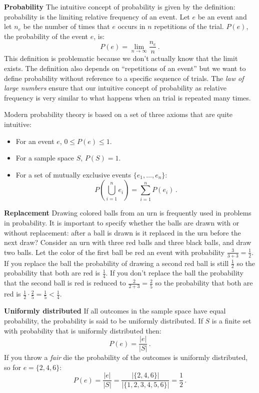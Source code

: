 \textbf{Probability} The intuitive concept of probability is given by the definition: probability is the limiting relative frequency of an event. Let $e$ be an event and let $n_e$ be the number of times that $e$ occurs in $n$ repetitions of the trial. $P(e)$, the probability of the event $e$, is:
\[
P(e) = \lim_{n\rightarrow \infty} \frac{n_e}{n}\,.
\]
This definition is problematic because we don't actually know that the limit exists. The definition also depends on ``repetitions of an event'' but we want to define probability without reference to a specific sequence of trials. The \emph{law of large numbers} ensure that our intuitive concept of probability as relative frequency is very similar to what happens when an trial is repeated many times.

Modern probability theory is based on a set of three axioms that are quite intuitive:
\begin{itemize}
\item For an event $e$, $0\leq P(e) \leq 1$.
\item For a sample space $S$, $P(S) = 1$.
\item For a set of mutually exclusive events $\{e_1,\ldots,e_n\}$:
\[
P\left(\bigcup_{i=1}^{n} e_i\right)=\sum_{i=1}^{n} P(e_i)\,.
\]
\end{itemize}

\textbf{Replacement} Drawing colored balls from an urn is frequently used in problems in probability. It is important to specify whether the balls are drawn with or without replacement: after a ball is drawn is it replaced in the urn before the next draw? Consider an urn with three red balls and three black balls, and draw two balls. Let the color of the first ball be red an event with probability $\frac{3}{3+3}=\frac{1}{2}$. If you replace the ball the probability of drawing a second red ball is still $\frac{1}{2}$ so the probability that both are red is $\frac{1}{4}$. If you don't replace the ball the probability that the second ball is red is reduced to $\frac{2}{2+3}=\frac{2}{5}$ so the probability that both are red is $\frac{1}{2}\cdot\frac{2}{5}=\frac{1}{5}<\frac{1}{4}$.

\textbf{Uniformly distributed} If all outcomes in the sample space have equal probability, the probability is said to be uniformly distributed. If $S$ is a finite set with probability that is uniformly distributed then:
\[
P(e)=\frac{|e|}{|S|}\,.
\]
If you throw a \emph{fair} die the probability of the outcomes is uniformly distributed, so for $e=\{2,4,6\}$:
\[
P(e) = \frac{|e|}{|S|} = \frac{|\{2,4,6\}|}{|\{1,2,3,4,5,6\}|}=\frac{1}{2}\,.
\]

